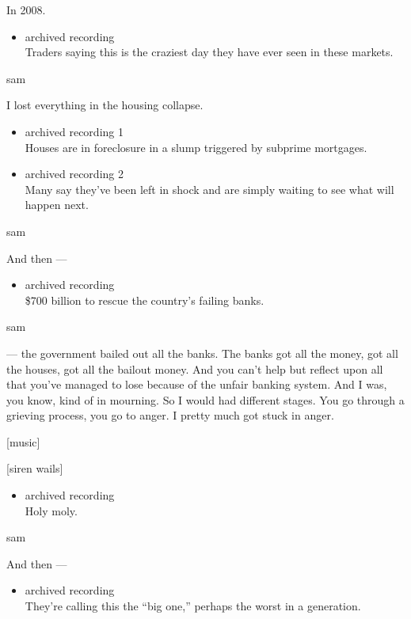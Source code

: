 In 2008.

\begin{itemize}
\tightlist
\item
  archived recording\\
  Traders saying this is the craziest day they have ever seen in these
  markets.
\end{itemize}

sam

I lost everything in the housing collapse.

\begin{itemize}
\item
  archived recording 1\\
  Houses are in foreclosure in a slump triggered by subprime mortgages.
\item
  archived recording 2\\
  Many say they've been left in shock and are simply waiting to see what
  will happen next.
\end{itemize}

sam

And then ---

\begin{itemize}
\tightlist
\item
  archived recording\\
  \$700 billion to rescue the country's failing banks.
\end{itemize}

sam

--- the government bailed out all the banks. The banks got all the
money, got all the houses, got all the bailout money. And you can't help
but reflect upon all that you've managed to lose because of the unfair
banking system. And I was, you know, kind of in mourning. So I would had
different stages. You go through a grieving process, you go to anger. I
pretty much got stuck in anger.

{[}music{]}

{[}siren wails{]}

\begin{itemize}
\tightlist
\item
  archived recording\\
  Holy moly.
\end{itemize}

sam

And then ---

\begin{itemize}
\tightlist
\item
  archived recording\\
  They're calling this the ``big one,'' perhaps the worst in a
  generation.
\end{itemize}

